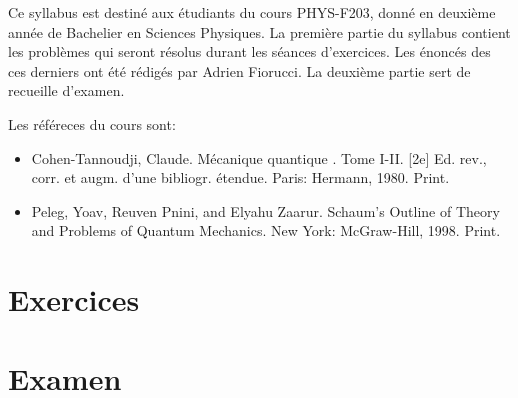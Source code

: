 \documentclass[a4paper,10pt]{book}
\begin{document}


\nocite{*}

\thispagestyle{plain}

Ce syllabus est destiné aux étudiants du cours PHYS-F203, donné en deuxième année de Bachelier en Sciences Physiques. La première partie du syllabus contient les problèmes qui seront résolus durant les séances d'exercices. Les énoncés des ces derniers ont été rédigés par Adrien Fiorucci. La deuxième partie sert de recueille d'examen.

Les référeces du cours sont: 
\begin{itemize}[label=\textbullet]
    \item Cohen-Tannoudji, Claude. Mécanique quantique . Tome I-II. [2e] Ed. rev., corr. et augm. d’une bibliogr. étendue. Paris: Hermann, 1980. Print.
    \item Peleg, Yoav, Reuven Pnini, and Elyahu Zaarur. Schaum's Outline of Theory and Problems of Quantum Mechanics. New York: McGraw-Hill, 1998. Print.
\end{itemize}

\vspace{17cm}



\pagebreak

\thispagestyle{plain}

\tableofcontents

\part{Exercices}

\makeatletter
\renewcommand{\@chapapp}{Séance}
\makeatother















\part{Examen}

\makeatletter
\renewcommand{\@chapapp}{Examen}
\makeatother

\thispagestyle{plain}
\end{document}
